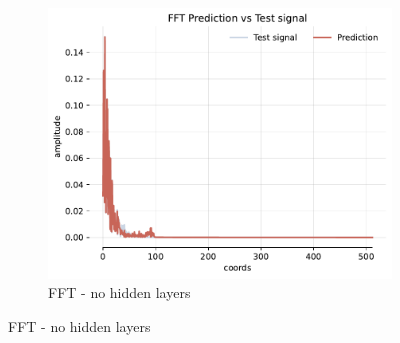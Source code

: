 \begin{figure}[!h]
    \begin{subfigure}[b]{0.32\textwidth}
        \centering
        \includegraphics[width=\textwidth]{img/ch3/fft-2048hf-0hl-96w-sub3.pdf}
        \caption{FFT - no hidden layers}
    \end{subfigure}


\end{figure}
